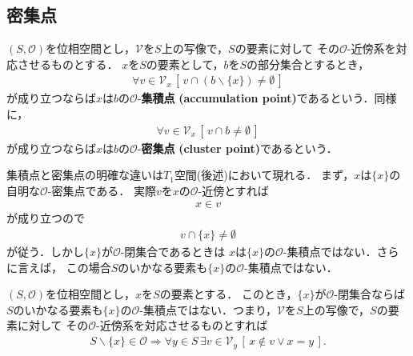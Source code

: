 \subsection{密集点}
	\begin{screen}
		\begin{dfn}
			$(S,\mathscr{O})$を位相空間とし，$\mathcal{V}$を$S$上の写像で，$S$の要素に対して
			その$\mathscr{O}$-近傍系を対応させるものとする．
			$x$を$S$の要素として，$b$を$S$の部分集合とするとき，
			\begin{align}
				\forall v \in \mathcal{V}_{x}\, 
				\left[\, v \cap (b \backslash \{x\}) \neq \emptyset\, \right]
			\end{align}
			が成り立つならば$x$は$b$の$\mathscr{O}$-{\bf 集積点}
			{\bf (accumulation point)}であるという．同様に，
			\begin{align}
				\forall v \in \mathcal{V}_{x}\, \left[\, v \cap b \neq \emptyset\, \right]
			\end{align}
			が成り立つならば$x$は$b$の$\mathscr{O}$-{\bf 密集点}
			{\bf (cluster point)}であるという．
		\end{dfn}
	\end{screen}
	
	集積点と密集点の明確な違いは$T_1$空間(後述)において現れる．
	まず，$x$は$\{x\}$の自明な$\mathscr{O}$-密集点である．
	実際$v$を$x$の$\mathscr{O}$-近傍とすれば
	\begin{align}
		x \in v
	\end{align}
	が成り立つので
	\begin{align}
		v \cap \{x\} \neq \emptyset
	\end{align}
	が従う．しかし$\{x\}$が$\mathscr{O}$-閉集合であるときは
	$x$は$\{x\}$の$\mathscr{O}$-集積点ではない．さらに言えば，
	この場合$S$のいかなる要素も$\{x\}$の$\mathscr{O}$-集積点ではない．
	
	\begin{screen}
		\begin{thm}[閉である一点集合は集積点を持たない]
		\label{thm:closed_singleton_has_no_accumulation_point}
			$(S,\mathscr{O})$を位相空間とし，$x$を$S$の要素とする．
			このとき，$\{x\}$が$\mathscr{O}$-閉集合ならば$S$のいかなる要素も$\{x\}$の$\mathscr{O}$-集積点ではない．つまり，$\mathcal{V}$を$S$上の写像で，$S$の要素に対して
			その$\mathscr{O}$-近傍系を対応させるものとすれば
			\begin{align}
				S \backslash \{x\} \in \mathscr{O} \Longrightarrow
				\forall y \in S\, \exists v \in \mathcal{V}_{y}\, 
				\left[\, x \notin v \vee x = y\, \right].
			\end{align}
		\end{thm}
	\end{screen}
	
